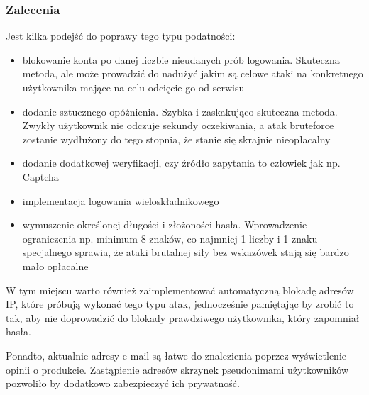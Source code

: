 \subsubsection{Zalecenia}
Jest kilka podejść do poprawy tego typu podatności:
   \begin{itemize}
    \item blokowanie konta po danej liczbie nieudanych prób logowania. Skuteczna metoda, ale może prowadzić do nadużyć jakim są celowe ataki na konkretnego użytkownika mające na celu odcięcie go od serwisu
    \item dodanie sztucznego opóźnienia. Szybka i zaskakująco skuteczna metoda. Zwykły użytkownik nie odczuje sekundy oczekiwania, a atak bruteforce zostanie wydłużony do tego stopnia, że stanie się skrajnie nieopłacalny
    \item dodanie dodatkowej weryfikacji, czy źródło zapytania to człowiek jak np. Captcha
    \item implementacja logowania wieloskładnikowego
    \item wymuszenie określonej długości i złożoności hasła. Wprowadzenie ograniczenia np. minimum 8 znaków, co najmniej 1 liczby i 1 znaku specjalnego sprawia, że ataki brutalnej siły bez wskazówek stają się bardzo mało opłacalne
   \end{itemize}
   W tym miejscu warto również zaimplementować automatyczną blokadę adresów IP, które próbują wykonać tego typu atak, jednocześnie pamiętając by zrobić to tak, aby nie doprowadzić do blokady prawdziwego użytkownika, który zapomniał hasła. 
   
   Ponadto, aktualnie adresy e-mail są łatwe do znalezienia poprzez wyświetlenie opinii o produkcie. Zastąpienie adresów skrzynek pseudonimami użytkowników pozwoliło by dodatkowo zabezpieczyć ich prywatność.